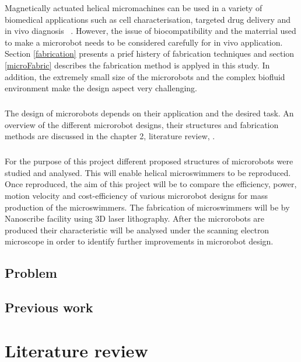 \documentclass[12pt,a4paper,titlepage]{report}
\begin{document}
Magnetically actuated helical micromachines can be used
 in a variety of biomedical applications such as cell characterisation, targeted drug delivery and in vivo 
diagnosis ~\citep{peyer2013magnetic}. However, the issue of biocompatibility and the materrial 
used to make a microrobot needs to be considered carefully for in vivo application\citep{qiu2014noncytotoxic}. 
Section \ref{fabrication} presents a prief histery of fabrication techniques and section \ref{microFabric} describes
 the fabrication method is applyed in this study.     
In addition, the extremely small size of the microrobots and the
complex biofluid environment make the design aspect very challenging. 


\paragraph{}
The design of microrobots depends on their application and the desired task. An overview of the different
 microrobot designs, their structures and fabrication methods are discussed in the chapter 2, literature review, .

\paragraph{}
For the purpose of this project different proposed structures of microrobots were studied
 and analysed. This will enable helical microswimmers to be reproduced. Once reproduced, the aim of this project will be to compare
 the efficiency, power, motion velocity and cost-efficiency of various microrobot designs for mass production
 of the microswimmers. The fabrication of microswimmers will be by Nanoscribe facility using 3D laser
 lithography. After the microrobots are produced their characteristic will be analysed
 under the scanning electron microscope in order to identify further improvements in microrobot design. 

\section{Problem}

\section{Previous work}



\chapter{Literature review}
 
\end{document}
